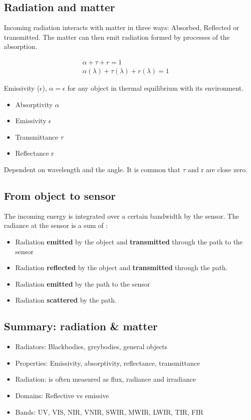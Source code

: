 	\subsection{Radiation and matter}
	Incoming radiation interacts with matter in three ways: Absorbed, Reflected or transmitted. The matter can then emit radiation formed by processes of the absorption. 

	\begin{equation}
	\begin{aligned}
		\alpha + \tau + r = 1 \\
		\alpha(\lambda) + \tau(\lambda) + r(\lambda) = 1
	\end{aligned}
	\end{equation}

	Emissivity ($\epsilon$), $\alpha = \epsilon$ for any object in thermal equilibrium with its environment. 

	\begin{itemize}
		\item Absorptivity $\alpha$
		\item Emissivity $\epsilon$
		\item Transmittance $\tau$
		\item Reflectance r
	\end{itemize}

	Dependent on wavelength and the angle. It is common that $\tau$ and r are close zero. 

	\subsection{From object to sensor}
	The incoming energy is integrated over a certain bandwidth by the sensor. The radiance at the sensor is a sum of :
	\begin{itemize}
		\item Radiation \textbf{emitted} by the object and \textbf{transmitted} through the path to the sensor
		\item Radiation \textbf{reflected} by the object and \textbf{transmitted} through the path.
		\item Radiation \textbf{emitted} by the path to the sensor
		\item Radiation \textbf{scattered} by the path. 
	\end{itemize}

	\subsection{Summary: radiation \& matter}
	\begin{itemize}
		\item Radiators: Blackbodies, greybodies, general objects
		\item Properties: Emissivity, absorptivity, reflectance, transmittance
		\item Radiation: is often measured as flux, radiance and irradiance
		\item Domains: Reflective vs emissive
		\item Bands: UV, VIS, NIR, VNIR, SWIR, MWIR, LWIR, TIR, FIR
	\end{itemize}
	
